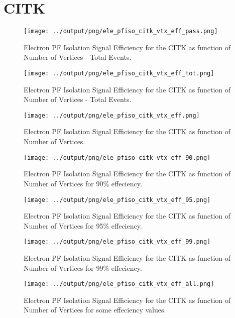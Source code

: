 \documentclass[11pt]{book}
\begin{document}
\section{CITK}
\begin{figure}[htb]
\centering
\texttt{[image: ../output/png/ele\_pfiso\_citk\_vtx\_eff\_pass.png]}
\caption{Electron PF Isolation Signal Efficiency for the CITK as function of Number of Vertices - Total Events.}
\label{fig:ele_pfiso_vtx_eff_citk_pass}
\end{figure}

\begin{figure}[htb]
\centering
\texttt{[image: ../output/png/ele\_pfiso\_citk\_vtx\_eff\_tot.png]}
\caption{Electron PF Isolation Signal Efficiency for the CITK as function of Number of Vertices - Total Events.}
\label{fig:ele_pfiso_vtx_eff_citk_tot}
\end{figure}

\begin{figure}[htb]
\centering
\texttt{[image: ../output/png/ele\_pfiso\_citk\_vtx\_eff.png]}
\caption{Electron PF Isolation Signal Efficiency for the CITK as function of Number of Vertices.}
\label{fig:ele_pfiso_vtx_eff_citk}
\end{figure}

\begin{figure}[htb]
\centering
\texttt{[image: ../output/png/ele\_pfiso\_citk\_vtx\_eff\_90.png]}
\caption{Electron PF Isolation Signal Efficiency for the CITK as function of Number of Vertices for 90\% effeciency.}
\label{fig:ele_pfiso_vtx_eff_citk_eff_90}
\end{figure}

\begin{figure}[htb]
\centering
\texttt{[image: ../output/png/ele\_pfiso\_citk\_vtx\_eff\_95.png]}
\caption{Electron PF Isolation Signal Efficiency for the CITK as function of Number of Vertices for 95\% effeciency.}
\label{fig:ele_pfiso_vtx_eff_citk_eff_95}
\end{figure}

\begin{figure}[htb]
\centering
\texttt{[image: ../output/png/ele\_pfiso\_citk\_vtx\_eff\_99.png]}
\caption{Electron PF Isolation Signal Efficiency for the CITK as function of Number of Vertices for 99\% effeciency.}
\label{fig:ele_pfiso_vtx_eff_citk_eff_99}
\end{figure}

\begin{figure}[htb]
\centering
\texttt{[image: ../output/png/ele\_pfiso\_citk\_vtx\_eff\_all.png]}
\caption{Electron PF Isolation Signal Efficiency for the CITK as function of Number of Vertices for some effeciency values.}
\label{fig:ele_pfiso_vtx_eff_citk_eff_all}
\end{figure}
\end{document}
